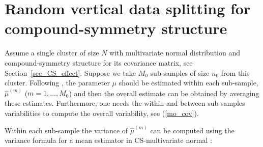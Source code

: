 \documentclass[11pt,a5paper,twoside]{book}
\begin{document}
{\setcounter{equation}{0}
\section[Random vertical data splitting for CS]{Random vertical data splitting for compound-symmetry structure}
\label{app2}
Assume a single cluster of size $N$ with multivariate normal distribution and compound-symmetry structure for its covariance matrix, see Section~\ref{sec_CS_effect}. Suppose we take $M_0$ sub-samples of size $n_0$ from this cluster. Following \cite{hoffman2001}, the parameter $\mu$ should be estimated within each sub-sample, $\widehat{\mu}^{(m)}$ ($m=1,\ldots,M_0$) and then the overall estimate can be obtained by averaging these estimates. Furthermore, one needs the within and between sub-samples variabilities to compute the overall variability, see (\ref{mo_cov}).

Within each sub-sample the variance of $\widehat{\mu}^{(m)}$ can be computed using the variance formula for a mean estimator in CS-multivariate normal \cite{Iddi2011} :

}
\end{document}

